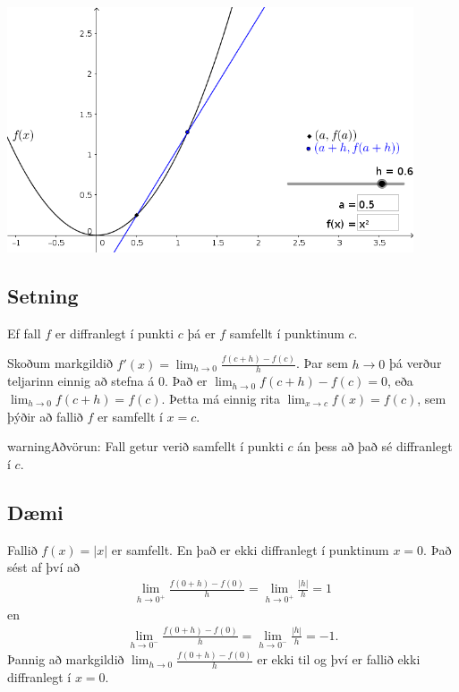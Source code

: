\documentclass[b5paper,10pt,icelandic]{sphinxmanual}
\begin{document}
\begin{center}
\includegraphics[width=12cm,keepaspectratio=true]{./01_afleida.png}
\end{center}



\subsection{Setning}
\label{\detokenize{kafli03:setning}}
Ef fall \(f\) er diffranlegt í punkti \(c\) þá er \(f\)
samfellt í punktinum \(c\).


Skoðum markgildið \(f'(x)=\lim_{h\to 0} \frac{f(c+h)-f(c)}{h}\). Þar
sem \(h\to 0\) þá verður teljarinn einnig að stefna á 0. Það er
\(\lim_{h \to 0} f(c+h)-f(c) = 0\), eða
\(\lim_{h \to 0} f(c+h) = f(c)\). Þetta má einnig rita
\(\lim_{x \to c} f(x) = f(c)\), sem þýðir að fallið \(f\) er
samfellt í \(x=c\).

\begin{sphinxadmonition}{warning}{Aðvörun:}
Fall getur verið samfellt í punkti \(c\) án þess að það sé
diffranlegt í \(c\).
\end{sphinxadmonition}


\subsection{Dæmi}
\label{\detokenize{kafli03:id1}}
Fallið \(f(x) = |x|\) er samfellt. En það er ekki diffranlegt í
punktinum \(x=0\). Það sést af því að
\begin{equation*}
\begin{split}\lim_{h\to 0^+} \frac{f(0+h)-f(0)}{h} = \lim_{h\to 0^+} \frac{|h|}{h} = 1\end{split}
\end{equation*}
en
\begin{equation*}
\begin{split}\lim_{h\to 0^-} \frac{f(0+h)-f(0)}{h} = \lim_{h\to 0^-} \frac{|h|}{h} = -1.\end{split}
\end{equation*}
Þannig að markgildið \(\lim_{h\to 0} \frac{f(0+h)-f(0)}{h}\) er ekki til og því er
fallið ekki diffranlegt í \(x=0\).
\end{document}
